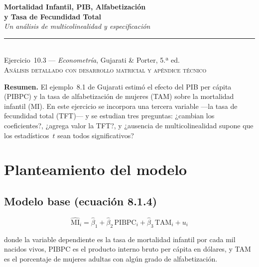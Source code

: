 \documentclass[12pt, letterpaper]{article}
\newcommand{\betahat}{\hat{\beta}}
\begin{document}
\begin{center}
  {\LARGE\bfseries Mortalidad Infantil, PIB, Alfabetización}\\[6pt]
  {\LARGE\bfseries y Tasa de Fecundidad Total}\\[10pt]
  {\large\itshape Un análisis de multicolinealidad y especificación}\\[14pt]
  \rule{0.55\linewidth}{0.6pt}\\[8pt]
  {\normalsize Ejercicio~10.3 — \textit{Econometría}, Gujarati \& Porter, 5.ª ed.}\\[4pt]
  {\small\textsc{Análisis detallado con desarrollo matricial y apéndice técnico}}
\end{center}

\vspace{10pt}

\noindent\textbf{Resumen.}\quad
El ejemplo~8.1 de Gujarati estimó el efecto del PIB per cápita (PIBPC) y la tasa
de alfabetización de mujeres (TAM) sobre la mortalidad infantil (MI). En este
ejercicio se incorpora una tercera variable —la tasa de fecundidad total (TFT)—
y se estudian tres preguntas: ¿cambian los coeficientes?, ¿agrega valor la TFT?,
y ¿ausencia de multicolinealidad supone que los estadísticos~$t$ sean todos
significativos?

\vspace{6pt}

\section{Planteamiento del modelo}

\subsection{Modelo base (ecuación 8.1.4)}

\begin{equation}
  \widehat{\text{MI}}_i
    = \betahat_1
    + \betahat_2\,\text{PIBPC}_i
    + \betahat_3\,\text{TAM}_i
    + u_i
  \label{eq:base}
\end{equation}

\noindent donde la variable dependiente es la tasa de mortalidad infantil por cada
mil nacidos vivos, PIBPC es el producto interno bruto per cápita en dólares, y TAM
es el porcentaje de mujeres adultas con algún grado de alfabetización.
\end{document}
